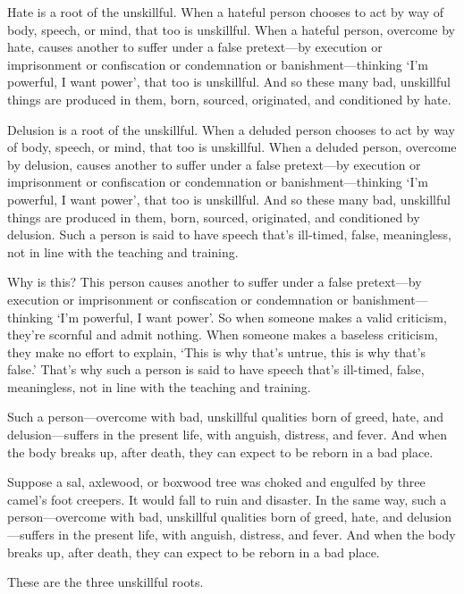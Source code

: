 \documentclass[12pt,openany]{book}%
\begin{document}
Hate is a root of the unskillful. When a hateful person chooses to act by way of body, speech, or mind, that too is unskillful. When a hateful person, overcome by hate, causes another to suffer under a false pretext—by execution or imprisonment or confiscation or condemnation or banishment—thinking ‘I’m powerful, I want power’, that too is unskillful. And so these many bad, unskillful things are produced in them, born, sourced, originated, and conditioned by hate. 

Delusion is a root of the unskillful. When a deluded person chooses to act by way of body, speech, or mind, that too is unskillful. When a deluded person, overcome by delusion, causes another to suffer under a false pretext—by execution or imprisonment or confiscation or condemnation or banishment—thinking ‘I’m powerful, I want power’, that too is unskillful. And so these many bad, unskillful things are produced in them, born, sourced, originated, and conditioned by delusion. Such a person is said to have speech that’s ill-timed, false, meaningless, not in line with the teaching and training. 

Why is this? This person causes another to suffer under a false pretext—by execution or imprisonment or confiscation or condemnation or banishment—thinking ‘I’m powerful, I want power’. So when someone makes a valid criticism, they’re scornful and admit nothing. When someone makes a baseless criticism, they make no effort to explain, ‘This is why that’s untrue, this is why that’s false.’ That’s why such a person is said to have speech that’s ill-timed, false, meaningless, not in line with the teaching and training. 

Such a person—overcome with bad, unskillful qualities born of greed, hate, and delusion—suffers in the present life, with anguish, distress, and fever. And when the body breaks up, after death, they can expect to be reborn in a bad place. 

Suppose a sal, axlewood, or boxwood tree was choked and engulfed by three camel’s foot creepers. It would fall to ruin and disaster. In the same way, such a person—overcome with bad, unskillful qualities born of greed, hate, and delusion—suffers in the present life, with anguish, distress, and fever. And when the body breaks up, after death, they can expect to be reborn in a bad place. 

These are the three unskillful roots. 
\end{document}
